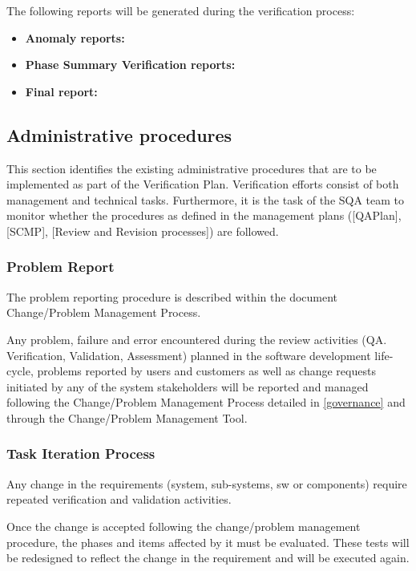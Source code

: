 \documentclass{template/openetcs_report}
\begin{document}
The following reports will be generated during the verification process:
\begin{itemize}
\item \textbf{Anomaly reports:} 
\item \textbf{Phase Summary Verification reports:} 
\item \textbf{Final report:}
\end{itemize}


\subsection{Administrative procedures}
This section identifies the existing administrative procedures that
are to be implemented as part of the Verification Plan. 
Verification efforts consist of both management and technical tasks.
Furthermore, it is the task of the SQA team to monitor whether the
procedures as defined in the management plans ([QAPlan], [SCMP],
[Review and Revision processes]) are followed. 

\subsubsection{Problem Report}
The problem reporting procedure is described within the document Change/Problem Management Process.

Any problem, failure and error encountered during the review activities (QA. Verification, Validation, Assessment) planned in the software development life-cycle, problems reported by users and customers as well as change requests initiated by any of the system stakeholders will be reported and managed following the Change/Problem Management Process detailed in \href{https://github.com/openETCS/governance/tree/master/Change-Problem%20Process}{[governance]} and through the Change/Problem Management Tool.

\subsubsection{Task Iteration Process}
Any change in the requirements (system, sub-systems, sw or components)
require repeated verification and validation activities. 

Once the change is accepted following the change/problem management
procedure, the phases and items affected by it must be
evaluated. These tests will be redesigned to reflect the change in the
requirement and will be executed again. 
\end{document}
